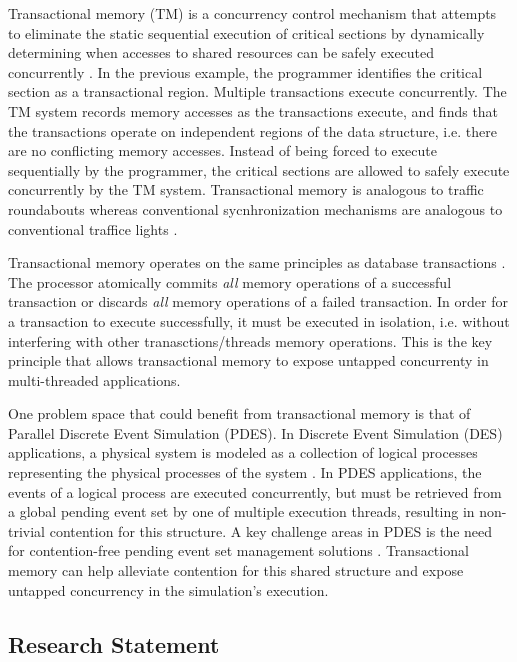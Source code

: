 \documentclass[a4paper]{article}
\begin{document}
\indent
Transactional memory (TM) is a concurrency control mechanism that
attempts to eliminate the static sequential execution of critical sections by
dynamically determining when accesses to shared resources can be safely executed
concurrently \cite{sle_rajwar}.  In the previous example, the programmer
identifies the critical section as a transactional region. Multiple transactions
execute concurrently.  The TM system records memory accesses as the transactions
execute, and finds that the transactions operate on independent regions of the
data structure, i.e. there are no conflicting memory accesses.  Instead of being
forced to execute sequentially by the programmer, the critical sections are
allowed to safely execute concurrently by the TM system.  Transactional memory
is analogous to traffic roundabouts whereas conventional sycnhronization
mechanisms are analogous to conventional traffice lights \cite{neuling_vid}.
\par

\indent 
Transactional memory operates on the same principles as database
transactions \cite{tm_2nd}.  The processor atomically commits \textit{all}
memory operations of a successful transaction or discards \textit{all} memory
operations of a failed transaction.  In order for a transaction to execute
successfully, it must be executed in isolation, i.e. without interfering with
other tranasctions/threads memory operations.  This is the key principle that
allows transactional memory to expose untapped concurrenty in multi-threaded
applications.
\par 

\indent 
One problem space that could benefit from transactional memory is that
of Parallel Discrete Event Simulation (PDES).  In Discrete Event Simulation
(DES) applications, a physical system is modeled as a collection of logical
processes representing the physical processes of the system \cite{fujimoto}.  In
PDES applications, the events of a logical process are executed concurrently,
but must be retrieved from a global pending event set by one of multiple execution
threads, resulting in non-trivial contention for this structure.  A key
challenge areas in PDES is the need for contention-free pending event set
management solutions \cite{dickman}. Transactional memory can help alleviate
contention for this shared structure and expose untapped concurrency in the
simulation's execution.
\par

\subsection{\textbf{Research Statement}}
\end{document}
